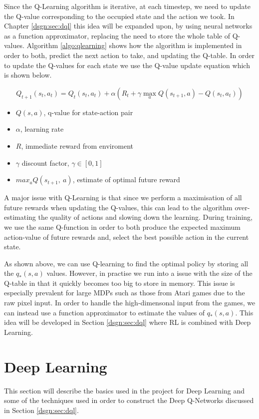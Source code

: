 Since the Q-Learning algorithm is iterative, at each timestep, we need to update the Q-value corresponding to the occupied state and the action we took. In Chapter \ref{dsgn:sec:dql} this idea will be expanded upon, by using neural networks as a function approximator, replacing the need to store the whole table of Q-values. Algorithm \ref{algo:qlearning} shows how the algorithm is implemented in order to both, predict the next action to take, and updating the Q-table. In order to update the Q-values for each state we use the Q-value update equation which is shown below.

\begin{defn}
	$$Q_{t+1}(s_t, a_t) = Q_t(s_t, a_t) + \alpha(R_t + \gamma \max_a Q(s_{t+1}, a) - Q(s_t, a_t))$$
	\begin{itemize}
		\item $Q(s, a)$, q-value for state-action pair
		\item $\alpha$, learning rate
		\item $R$, immediate reward from enviroment
		\item $\gamma$ discount factor, $\gamma\in[0,1]$
		\item $max_a Q(s_{t + 1},~a)$, estimate of optimal future reward
	\end{itemize}
\end{defn}

A major issue with Q-Learning is that since we perform a maximisation of all future rewards when updating the Q-values, this can lead to the algorithm over-estimating the quality of actions and slowing down the learning. During training, we use the same Q-function in order to both produce the expected maximum action-value of future rewards and, select the best possible action in the current state.



As shown above, we can use Q-learning to find the optimal policy by storing all the $q_*(s, a)$ values. However, in practise we run into a issue with the size of the Q-table in that it quickly becomes too big to store in memory. This issue is especially prevalent for large MDPs such as those from Atari games due to the raw pixel input. In order to handle the high-dimensonal input from the games, we can instead use a function approximator to estimate the values of $q_*(s, a)$. This idea will be developed in Section \ref{dsgn:sec:dql} where RL is combined with Deep Learning.

\section{Deep Learning}
\label{dsgn:sec:dl}
This section will describe the basics used in the project for Deep Learning and some of the techniques used in order to construct the Deep Q-Networks discussed in Section \ref{dsgn:sec:dql}.

